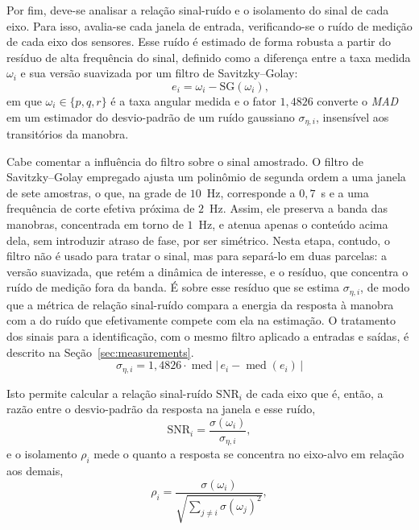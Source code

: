 Por fim, deve-se analisar a relação sinal-ruído e o isolamento do sinal de cada eixo. Para isso, avalia-se cada janela de entrada, verificando-se o ruído de medição de cada eixo dos sensores. Esse ruído é estimado de forma robusta a partir do resíduo de alta frequência do sinal, definido como a diferença entre a taxa medida $\omega_i$ e sua versão suavizada por um filtro de Savitzky--Golay:
\begin{equation}
    \qquad e_i = \omega_i - \mathrm{SG}(\omega_i),
    \label{eq:ruido2}
\end{equation}
em que $\omega_i \in \{p,q,r\}$ é a taxa angular medida e o fator $1{,}4826$ converte o \textit{MAD} em um estimador do desvio-padrão de um ruído gaussiano $\sigma_{\eta,i}$, insensível aos transitórios da manobra.

Cabe comentar a influência do filtro sobre o sinal amostrado. O filtro de Savitzky--Golay empregado ajusta um polinômio de segunda ordem a uma janela de sete amostras, o que, na grade de $10$~Hz, corresponde a $0{,}7$~s e a uma frequência de corte efetiva próxima de $2$~Hz. Assim, ele preserva a banda das manobras, concentrada em torno de $1$~Hz, e atenua apenas o conteúdo acima dela, sem introduzir atraso de fase, por ser simétrico. Nesta etapa, contudo, o filtro não é usado para tratar o sinal, mas para separá-lo em duas parcelas: a versão suavizada, que retém a dinâmica de interesse, e o resíduo, que concentra o ruído de medição fora da banda. É sobre esse resíduo que se estima $\sigma_{\eta,i}$, de modo que a métrica de relação sinal-ruído compara a energia da resposta à manobra com a do ruído que efetivamente compete com ela na estimação. O tratamento dos sinais para a identificação, com o mesmo filtro aplicado a entradas e saídas, é descrito na Seção~\ref{sec:measurements}.
\begin{equation}
    \sigma_{\eta,i} = 1{,}4826 \cdot \operatorname{med}\big|\, e_i - \operatorname{med}(e_i) \,\big|
    \label{eq:ruido1}
\end{equation}

Isto permite calcular a relação sinal-ruído $\mathrm{SNR}_i$ de cada eixo que é, então, a razão entre o desvio-padrão da resposta na janela e esse ruído,
\begin{equation}
\mathrm{SNR}_i = \frac{\sigma(\omega_i)}{\sigma_{\eta,i}},
\label{eq:snr}
\end{equation}
e o isolamento $\rho_i$ mede o quanto a resposta se concentra no eixo-alvo em relação aos demais,
\begin{equation}
\rho_i = \frac{\sigma(\omega_i)}{\sqrt{\sum_{j \neq i} \sigma(\omega_j)^2}},
\label{eq:isolamento}
\end{equation}

